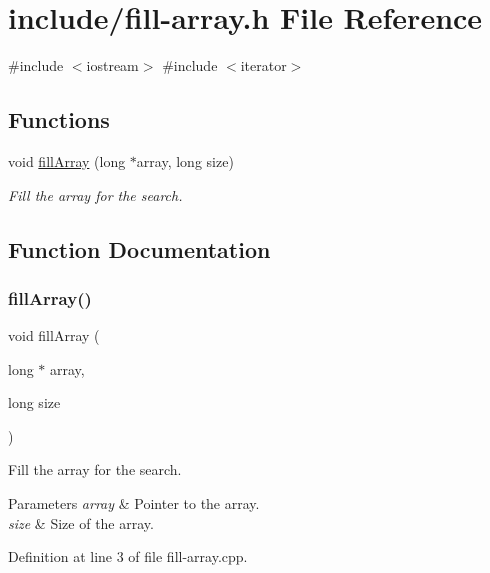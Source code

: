 \hypertarget{fill-array_8h}{}\section{include/fill-\/array.h File Reference}
\label{fill-array_8h}
{\ttfamily \#include $<$iostream$>$}\newline
{\ttfamily \#include $<$iterator$>$}\newline
\subsection*{Functions}
\begin{DoxyCompactItemize}
\item 
void \mbox{\hyperlink{fill-array_8h_aa598c97a8086476a5d6143bc845e5027}{fill\+Array}} (long $\ast$array, long size)
\begin{DoxyCompactList}\small\item\em Fill the array for the search. \end{DoxyCompactList}\end{DoxyCompactItemize}


\subsection{Function Documentation}
\mbox{\label{fill-array_8h_aa598c97a8086476a5d6143bc845e5027}} 
\subsubsection{\texorpdfstring{fillArray()}{fillArray()}}
{\footnotesize\ttfamily void fill\+Array (\begin{DoxyParamCaption}\item[{long $\ast$}]{array,  }\item[{long}]{size }\end{DoxyParamCaption})}



Fill the array for the search. 


\begin{DoxyParams}{Parameters}
{\em array} & Pointer to the array. \\
\hline
{\em size} & Size of the array. \\
\hline
\end{DoxyParams}


Definition at line 3 of file fill-\/array.\+cpp.

